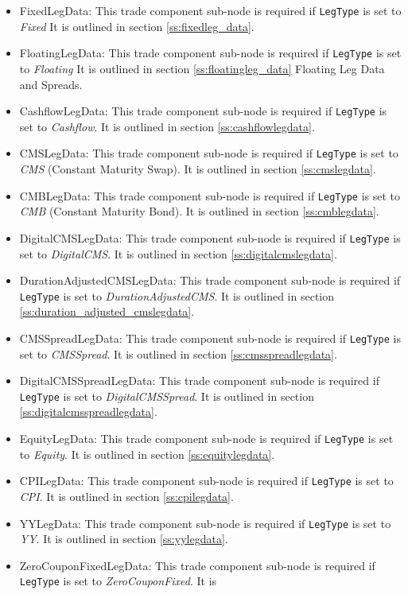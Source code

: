 \begin{itemize}
\item FixedLegData: This trade component sub-node is required if \lstinline!LegType! is set to \emph{Fixed} It is
outlined in section \ref{ss:fixedleg_data}.
\item FloatingLegData: This trade component sub-node is required if \lstinline!LegType! is set to \emph{Floating} It is
outlined in section \ref{ss:floatingleg_data} Floating Leg Data and Spreads.
\item CashflowLegData: This trade component sub-node is required if \lstinline!LegType! is set to \emph{Cashflow}. It is
  outlined in section \ref{ss:cashflowlegdata}.
\item CMSLegData: This trade component sub-node is required if \lstinline!LegType! is set to \emph{CMS} (Constant Maturity Swap). It is
  outlined in section \ref{ss:cmslegdata}.
  \item CMBLegData: This trade component sub-node is required if \lstinline!LegType! is set to \emph{CMB} (Constant Maturity Bond). It is
  outlined in section \ref{ss:cmblegdata}. 
\item DigitalCMSLegData: This trade component sub-node is required if \lstinline!LegType! is set to \emph{DigitalCMS}. It is
  outlined in section \ref{ss:digitalcmslegdata}.
\item DurationAdjustedCMSLegData: This trade component sub-node is required if \lstinline!LegType! is set to \emph{DurationAdjustedCMS}. It is
  outlined in section \ref{ss:duration_adjusted_cmslegdata}.  
\item CMSSpreadLegData: This trade component sub-node is required if \lstinline!LegType! is set to \emph{CMSSpread}. It is
  outlined in section \ref{ss:cmsspreadlegdata}.
\item DigitalCMSSpreadLegData: This trade component sub-node is required if \lstinline!LegType! is set to \emph{DigitalCMSSpread}. It is
  outlined in section \ref{ss:digitalcmsspreadlegdata}.
\item EquityLegData: This trade component sub-node is required if \lstinline!LegType! is set to \emph{Equity}. It is
  outlined in section \ref{ss:equitylegdata}.    
\item CPILegData: This trade component sub-node is required if \lstinline!LegType! is set to \emph{CPI}. It is
  outlined in section \ref{ss:cpilegdata}.
\item YYLegData: This trade component sub-node is required if \lstinline!LegType! is set to \emph{YY}. It is
  outlined in section \ref{ss:yylegdata}.
\item ZeroCouponFixedLegData: This trade component sub-node is required if \lstinline!LegType! is set to \emph{ZeroCouponFixed}. It is

\end{itemize}
